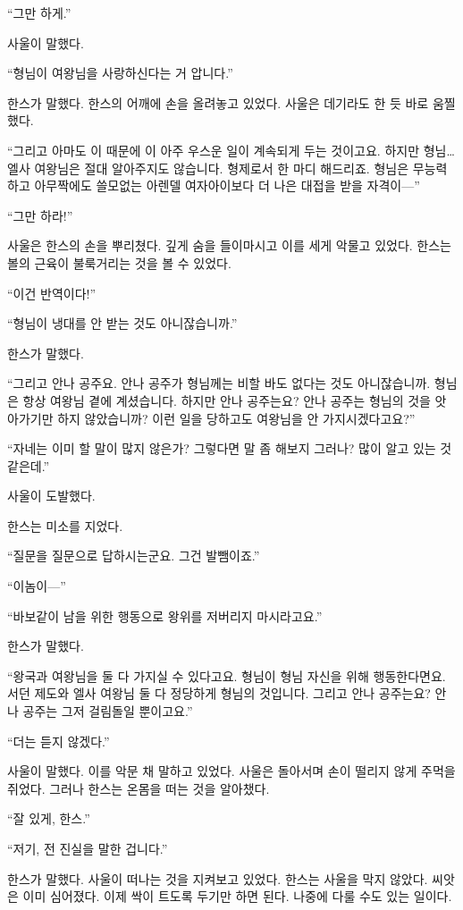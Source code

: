 ``그만 하게.''

사울이 말했다.

``형님이 여왕님을 사랑하신다는 거 압니다.''

한스가 말했다. 한스의 어깨에 손을 올려놓고 있었다. 사울은 데기라도 한 듯 바로 움찔했다.

``그리고 아마도 이 때문에 이 아주 우스운 일이 계속되게 두는 것이고요. 하지만 형님\ldots\,엘사 여왕님은 절대 알아주지도 않습니다. 형제로서 한 마디 해드리죠. 형님은 무능력하고 아무짝에도 쓸모없는 아렌델 여자아이보다 더 나은 대접을 받을 자격이—''

``그만 하라!''

사울은 한스의 손을 뿌리쳤다. 깊게 숨을 들이마시고 이를 세게 악물고 있었다. 한스는 볼의 근육이 불룩거리는 것을 볼 수 있었다.

``이건 반역이다!''

``형님이 냉대를 안 받는 것도 아니잖습니까.''

한스가 말했다.

``그리고 안나 공주요. 안나 공주가 형님께는 비할 바도 없다는 것도 아니잖습니까. 형님은 항상 여왕님 곁에 계셨습니다. 하지만 안나 공주는요? 안나 공주는 형님의 것을 앗아가기만 하지 않았습니까? 이런 일을 당하고도 여왕님을 안 가지시겠다고요?''

``자네는 이미 할 말이 많지 않은가? 그렇다면 말 좀 해보지 그러나? 많이 알고 있는 것 같은데.''

사울이 도발했다.

한스는 미소를 지었다.

``질문을 질문으로 답하시는군요. 그건 발뺌이죠.''

``이놈이—''

``바보같이 남을 위한 행동으로 왕위를 저버리지 마시라고요.''

한스가 말했다.

``왕국과 여왕님을 둘 다 가지실 수 있다고요. 형님이 형님 자신을 위해 행동한다면요. 서던 제도와 엘사 여왕님 둘 다 정당하게 형님의 것입니다. 그리고 안나 공주는요? 안나 공주는 그저 걸림돌일 뿐이고요.''

``더는 듣지 않겠다.''

사울이 말했다. 이를 악문 채 말하고 있었다. 사울은 돌아서며 손이 떨리지 않게 주먹을 쥐었다. 그러나 한스는 온몸을 떠는 것을 알아챘다.

``잘 있게, 한스.''

``저기, 전 진실을 말한 겁니다.''

한스가 말했다. 사울이 떠나는 것을 지켜보고 있었다. 한스는 사울을 막지 않았다. 씨앗은 이미 심어졌다. 이제 싹이 트도록 두기만 하면 된다. 나중에 다룰 수도 있는 일이다.

